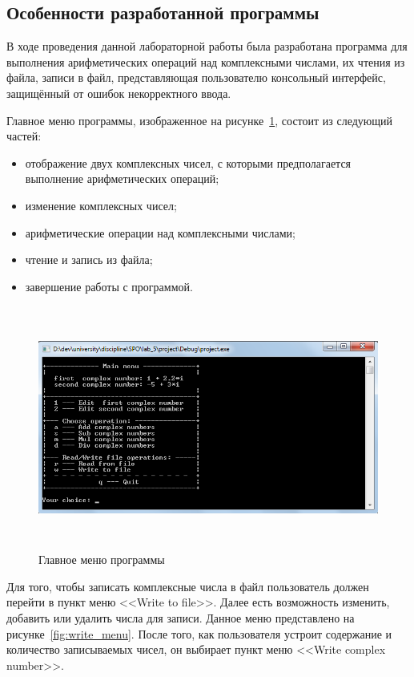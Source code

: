\subsection{Особенности разработанной программы}

В ходе проведения данной лабораторной работы была разработана программа для выполнения арифметических операций над комплексными числами, их чтения из файла, записи в файл, представляющая пользователю консольный интерфейс, защищённый от ошибок некорректного ввода.

Главное меню программы, изображенное на рисунке~\ref{fig:main_menu}, состоит из следующий частей:
\begin{itemize}
  \item отображение двух комплексных чисел, с которыми предполагается выполнение арифметических операций;
  \item изменение комплексных чисел;
  \item арифметические операции над комплексными числами;
  \item чтение и запись из файла;
  \item завершение работы с программой.
\end{itemize}

\begin{figure}[htbp]
  \centering
  \includegraphics[width=150mm,height=80mm]{img/main_menu}
  \caption{Главное меню программы}\label{fig:main_menu}
\end{figure}


Для того, чтобы записать комплексные числа в файл пользователь должен перейти в пункт меню <<Write to file>>. Далее есть возможность изменить, добавить или удалить числа для записи. Данное меню представлено на рисунке~\ref{fig:write_menu}. После того, как пользователя устроит содержание и количество записываемых чисел, он выбирает пункт меню <<Write complex number>>.

